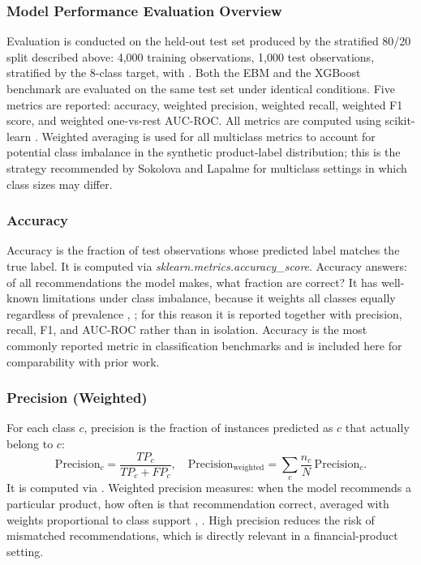 \documentclass{icsthesis}
\begin{document}
\begin{mainmatter}
				\subsubsection{Model Performance Evaluation Overview}
					Evaluation is conducted on the held-out test set produced by the stratified 80/20 split described above: 4{,}000 training observations, 1{,}000 test observations, stratified by the 8-class target, with . Both the EBM and the XGBoost benchmark are evaluated on the same test set under identical conditions. Five metrics are reported: accuracy, weighted precision, weighted recall, weighted F1 score, and weighted one-vs-rest AUC-ROC. All metrics are computed using scikit-learn \cite{ref74}. Weighted averaging is used for all multiclass metrics to account for potential class imbalance in the synthetic product-label distribution; this is the strategy recommended by Sokolova and Lapalme \cite{ref78} for multiclass settings in which class sizes may differ.

				\subsubsection{Accuracy}
					Accuracy is the fraction of test observations whose predicted label matches the true label. It is computed via \emph{sklearn.metrics.accuracy\_score}. Accuracy answers: of all recommendations the model makes, what fraction are correct? It has well-known limitations under class imbalance, because it weights all classes equally regardless of prevalence \cite{ref78}, \cite{ref58}; for this reason it is reported together with precision, recall, F1, and AUC-ROC rather than in isolation. Accuracy is the most commonly reported metric in classification benchmarks \cite{ref87} and is included here for comparability with prior work.

				\subsubsection{Precision (Weighted)}
					For each class $c$, precision is the fraction of instances predicted as $c$ that actually belong to $c$:
					\begin{equation*}
					    \mathrm{Precision}_c = \frac{TP_c}{TP_c + FP_c}, \quad \mathrm{Precision}_{\mathrm{weighted}} = \sum_c \frac{n_c}{N}\,\mathrm{Precision}_c.
					\end{equation*}
					It is computed via . Weighted precision measures: when the model recommends a particular product, how often is that recommendation correct, averaged with weights proportional to class support \cite{ref79}, \cite{ref78}. High precision reduces the risk of mismatched recommendations, which is directly relevant in a financial-product setting.


\end{mainmatter}
\end{document}
